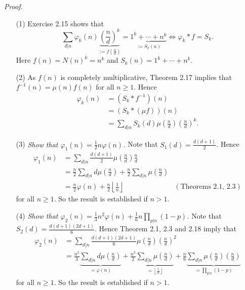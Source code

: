 \documentclass{article}
\begin{document}
\emph{Proof.}
\begin{enumerate}
\item[(1)]
  Exercise 2.15 shows that
  \[
    \sum_{d|n} \varphi_k(n) \underbrace{\left(\frac{n}{d}\right)^k}_{:= f\left(\frac{n}{d}\right)}
        = \underbrace{1^k + \cdots + n^k}_{:= S_k(n)}
    \Longleftrightarrow
    \varphi_k * f = S_k.
  \]
  Here $f(n) = N(n)^k = n^k$ and $S_k(n) = 1^k + \cdots + n^k$.

\item[(2)]
  As $f(n)$ is completely multiplicative,
  Theorem 2.17 implies that $f^{-1}(n) = \mu(n) f(n)$ for all $n \geq 1$.
  Hence
  \begin{align*}
    \varphi_k(n)
    &= (S_k * f^{-1})(n) \\
    &= (S_k * (\mu f))(n) \\
    &= \sum_{d|n} S_k(d) \mu\left(\frac{n}{d}\right)\left(\frac{n}{d}\right)^k.
  \end{align*}

\item[(3)]
  \emph{Show that $\varphi_1(n) = \frac{1}{2}n\varphi(n)$.}
  Note that $S_1(d) = \frac{d(d+1)}{2}$.
  Hence
  \begin{align*}
    \varphi_1(n)
    &= \sum_{d|n} \frac{d(d+1)}{2} \mu\left(\frac{n}{d}\right) \frac{n}{d} \\
    &= \frac{n}{2} \sum_{d|n} d \mu\left(\frac{n}{d}\right)
        + \frac{n}{2} \sum_{d|n} \mu\left(\frac{n}{d}\right) \\
    &= \frac{n}{2} \varphi(n)
        + \frac{n}{2} \left\lfloor \frac{1}{n} \right\rfloor
      &(\text{Theorems 2.1, 2.3})
  \end{align*}
  for all $n \geq 1$.
  So the result is established if $n > 1$.

\item[(4)]
  \emph{Show that $\varphi_2(n) = \frac{1}{3}n^2 \varphi(n) + \frac{1}{6} n\prod_{p|n}(1-p)$.}
  Note that $S_2(d) = \frac{d(d+1)(2d+1)}{6}$.
  Hence Theorem 2.1, 2.3 and 2.18 imply that
  \begin{align*}
    \varphi_2(n)
    &= \sum_{d|n} \frac{d(d+1)(2d+1)}{6} \mu\left(\frac{n}{d}\right) \left(\frac{n}{d}\right)^2 \\
    &= \frac{n^2}{3} \underbrace{\sum_{d|n} d \mu\left(\frac{n}{d}\right)}_{= \varphi(n)}
        + \frac{n^2}{2}
            \underbrace{\sum_{d|n} \mu\left(\frac{n}{d}\right)}_{= \left\lfloor \frac{1}{n} \right\rfloor}
        + \frac{n}{6}
            \underbrace{\sum_{d|n} \mu\left(\frac{n}{d}\right)\left(\frac{n}{d}\right)}_{
                = \prod_{p|n}(1 - p)}
  \end{align*}
  for all $n \geq 1$.
  So the result is established if $n > 1$.


\end{enumerate}
\end{document}
